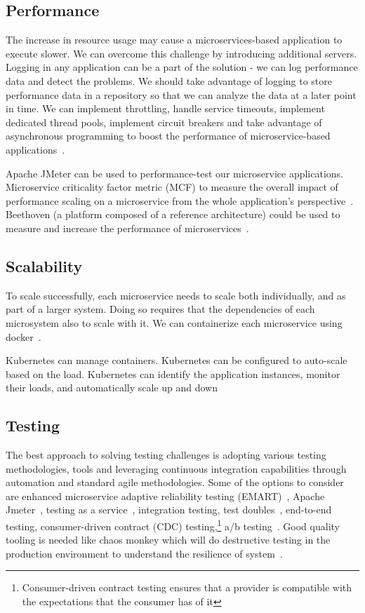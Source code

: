 \subsection{Performance}%
The increase in resource usage may cause a microservices-based application to execute slower. We can overcome this challenge by introducing additional servers. Logging in any application can be a part of the solution - we can log performance data and detect the problems. We should take advantage of logging to store performance data in a repository so that we can analyze the data at a later point in time. We can implement throttling, handle service timeouts, implement dedicated thread pools, implement circuit breakers and take advantage of asynchronous programming to boost the performance of microservice-based applications~\cite{Ghebremicael2017, Johansson2019, Zhihui2020}.

\par Apache JMeter can be used to performance-test our microservice applications. Microservice criticality factor metric (MCF) to measure the overall impact of performance scaling on a microservice from the whole application's perspective~\cite{Hou2019}. Beethoven (a platform composed of a reference architecture) could be used to measure and increase the performance of microservices~\cite{Monteiro2020}. 


\subsection{Scalability}%
 To scale successfully, each microservice needs to scale both individually, and as part of a larger system. Doing so requires that the dependencies of each microsystem also to scale with it. We can containerize each microservice using docker~\cite{coulson2020, Bahadori2018}.

\par Kubernetes can manage containers. Kubernetes can be configured to auto-scale based on the load. Kubernetes can identify the application instances, monitor their loads, and automatically scale up and down~\cite{McElhiney2018, khan2020}


\subsection{Testing}%
The best approach to solving testing challenges is adopting various testing methodologies, tools and leveraging continuous integration capabilities through automation and standard agile methodologies.
Some of the options to consider are enhanced microservice adaptive reliability testing (EMART)~\cite{Russo2020}, Apache Jmeter~\cite{Johansson2019}, testing as a service~\cite{Vanska2019}, integration testing, test doubles~\cite{Huttunen2017}, end-to-end testing, consumer-driven contract (CDC) testing,\footnote{Consumer-driven contract testing ensures that a provider is compatible with the expectations that the consumer has of it} a/b testing~\cite{Zaytev2018, Dmitrii2019}. Good quality tooling is needed like chaos monkey which will do destructive testing in the production environment to understand the resilience of system~\cite{Netflix}.


